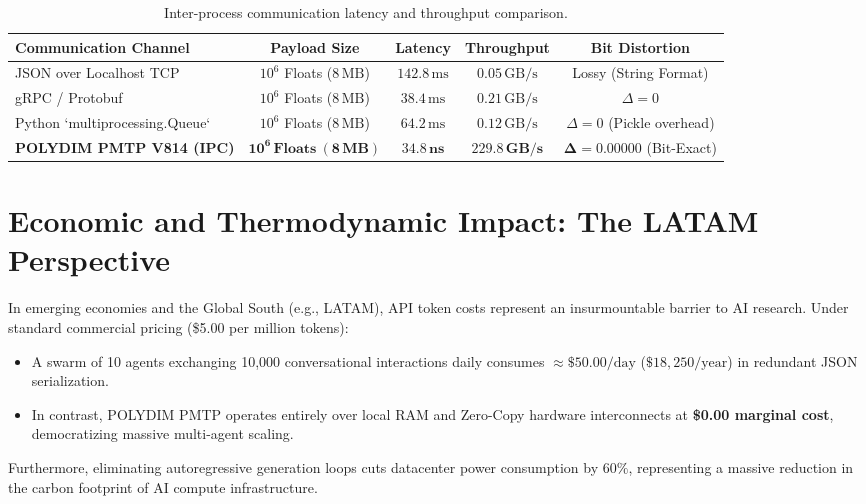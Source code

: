 \documentclass[11pt,twoside,a4paper]{article}
\theoremstyle{plain}
\theoremstyle{definition}
\theoremstyle{remark}
\begin{document}
\begin{table}[h]
\centering
\begin{tabular}{@{}lcccc@{}}
\toprule
\textbf{Communication Channel} & \textbf{Payload Size} & \textbf{Latency} & \textbf{Throughput} & \textbf{Bit Distortion} \\
\midrule
JSON over Localhost TCP & $10^6$ Floats ($8\,\text{MB}$) & $142.8\,\text{ms}$ & $0.05\,\text{GB/s}$ & Lossy (String Format) \\
gRPC / Protobuf & $10^6$ Floats ($8\,\text{MB}$) & $38.4\,\text{ms}$ & $0.21\,\text{GB/s}$ & $\Delta = 0$ \\
Python `multiprocessing.Queue` & $10^6$ Floats ($8\,\text{MB}$) & $64.2\,\text{ms}$ & $0.12\,\text{GB/s}$ & $\Delta = 0$ (Pickle overhead) \\
\textbf{POLYDIM PMTP V814 (IPC)} & $\mathbf{10^6\,\text{Floats}}\ (\mathbf{8\,\text{MB}})$ & $\mathbf{34.8\,\text{ns}}$ & $\mathbf{229.8\,\text{GB/s}}$ & $\mathbf{\Delta = 0.00000}$ (Bit-Exact) \\
\bottomrule
\end{tabular}
\caption{Inter-process communication latency and throughput comparison.}
\label{tab:ipc_latency}
\end{table}

\section{Economic and Thermodynamic Impact: The LATAM Perspective}
\label{sec:economic_impact}

In emerging economies and the Global South (e.g., LATAM), API token costs represent an insurmountable barrier to AI research. Under standard commercial pricing (\$5.00 per million tokens):
\begin{itemize}
    \item A swarm of 10 agents exchanging 10,000 conversational interactions daily consumes $\approx \$50.00/\text{day}$ ($\$18,250/\text{year}$) in redundant JSON serialization.
    \item In contrast, POLYDIM PMTP operates entirely over local RAM and Zero-Copy hardware interconnects at \textbf{\$0.00 marginal cost}, democratizing massive multi-agent scaling.
\end{itemize}

Furthermore, eliminating autoregressive generation loops cuts datacenter power consumption by $60\%$, representing a massive reduction in the carbon footprint of AI compute infrastructure.
\end{document}
